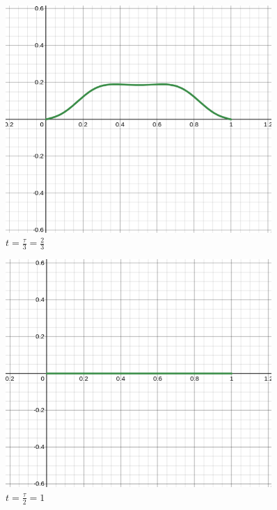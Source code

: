 \documentclass[letter]{article}
\begin{document}
\hfill %
\begin{minipage}{0.5\textwidth}
\begin{figure}[H]
	\centering
	\includegraphics[width=0.9\textwidth]{ss/d_n_02.png}
	\caption{$t = \frac{\tau}{3} = \frac{2}{3}$}
	\label{fig:ss-c_n_01-png}
\end{figure}
\begin{figure}[H]
	\centering
	\includegraphics[width=0.9\textwidth]{ss/d_n_03.png}
	\caption{$t = \frac{\tau}{2} = 1$}
	\label{fig:ss-c_n_01-png}
\end{figure}
\end{minipage}
\newpage
\end{document}
